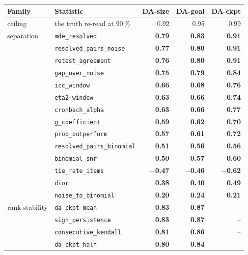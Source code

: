 \begin{table}[h]
\centering
\scriptsize
\begin{tabular}{@{}llrrr@{}}
\toprule
\textbf{Family} & \textbf{Statistic} & \textbf{DA-size} & \textbf{DA-goal} & \textbf{DA-ckpt} \\
\midrule
ceiling & the truth re-read at 90\,\% & 0.92 & 0.95 & 0.99 \\
\midrule
separation & \texttt{mde\_resolved} & \textbf{0.79} & \textbf{0.83} & \textbf{0.91} \\
 & \texttt{resolved\_pairs\_noise} & \textbf{0.77} & \textbf{0.80} & \textbf{0.91} \\
 & \texttt{retest\_agreement} & \textbf{0.76} & \textbf{0.80} & \textbf{0.91} \\
 & \texttt{gap\_over\_noise} & \textbf{0.75} & \textbf{0.79} & \textbf{0.84} \\
 & \texttt{icc\_window} & \textbf{0.66} & \textbf{0.68} & \textbf{0.76} \\
 & \texttt{eta2\_window} & \textbf{0.63} & \textbf{0.66} & \textbf{0.74} \\
 & \texttt{cronbach\_alpha} & \textbf{0.63} & \textbf{0.66} & \textbf{0.77} \\
 & \texttt{g\_coefficient} & \textbf{0.59} & \textbf{0.62} & \textbf{0.70} \\
 & \texttt{prob\_outperform} & \textbf{0.57} & \textbf{0.61} & \textbf{0.72} \\
 & \texttt{resolved\_pairs\_binomial} & \textbf{0.51} & \textbf{0.56} & \textbf{0.56} \\
 & \texttt{binomial\_snr} & \textbf{0.50} & \textbf{0.57} & \textbf{0.60} \\
 & \texttt{tie\_rate\_items} & \textbf{$-$0.47} & \textbf{$-$0.46} & \textbf{$-$0.62} \\
 & \texttt{dior} & \textbf{0.38} & \textbf{0.40} & \textbf{0.49} \\
 & \texttt{noise\_to\_binomial} & \textbf{0.20} & \textbf{0.24} & \textbf{0.21} \\
\midrule
rank stability & \texttt{da\_ckpt\_mean} & \textbf{0.83} & \textbf{0.87} & -- \\
 & \texttt{sign\_persistence} & \textbf{0.83} & \textbf{0.87} & -- \\
 & \texttt{consecutive\_kendall} & \textbf{0.81} & \textbf{0.86} & -- \\
 & \texttt{da\_ckpt\_half} & \textbf{0.80} & \textbf{0.84} & -- \\

\end{tabular}
\end{table}
